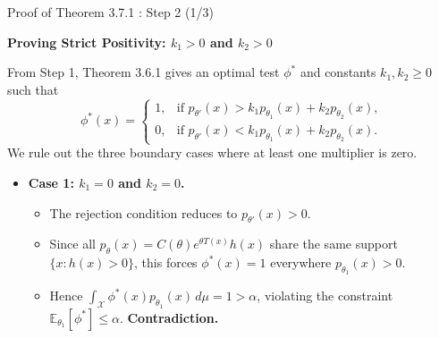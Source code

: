 \documentclass[10pt, aspectratio=169, xcolor=dvipsnames]{beamer}
\newcommand{\lead}[1]{{\color{UniBlue}\bfseries #1}}
\begin{document}
\begin{frame}{Proof of Theorem 3.7.1 : Step 2 (1/3)}
    
    \lead{Proving Strict Positivity: $k_1 > 0$ and $k_2 > 0$}\\
    \vspace{0.2cm}
    
    \color{Slate}
    From Step 1, Theorem 3.6.1 gives an optimal test $\phi^*$ and constants $k_1, k_2 \ge 0$ such that
    \[
        \phi^*(x) = \begin{cases}
            1, & \text{if } p_{\theta'}(x) > k_1 p_{\theta_1}(x) + k_2 p_{\theta_2}(x), \\
            0, & \text{if } p_{\theta'}(x) < k_1 p_{\theta_1}(x) + k_2 p_{\theta_2}(x).
        \end{cases}
    \]
    We rule out the three boundary cases where at least one multiplier is zero.
    
    \vspace{0.25cm}
    \begin{itemize}
        \item[\textcolor{Teal}{\textbullet}] \textbf{Case 1: $k_1 = 0$ and $k_2 = 0$.}
        \vspace{0.1cm}
        \begin{itemize}
            \setlength\itemsep{4pt}
            \item The rejection condition reduces to $p_{\theta'}(x) > 0$.
            \item Since all $p_\theta(x) = C(\theta) e^{\theta T(x)} h(x)$ share the same support $\{x : h(x) > 0\}$, this forces $\phi^*(x) = 1$ everywhere $p_{\theta_1}(x) > 0$.
            \item Hence $\displaystyle \int_{\mathcal{X}} \phi^*(x) p_{\theta_1}(x)\, d\mu = 1 > \alpha$, violating the constraint $\mathbb{E}_{\theta_1}[\phi^*] \le \alpha$. \textbf{Contradiction.}
        \end{itemize}
    \end{itemize}
\end{frame}
\end{document}
